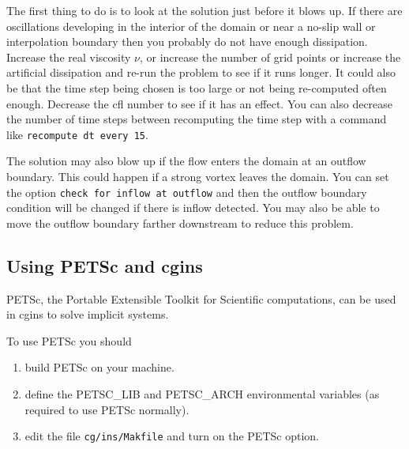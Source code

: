 \documentclass{article}
\begin{document}
The first thing to do is to look at the solution just before it blows up. If
there are oscillations developing in the interior of the domain or near a
no-slip wall or interpolation boundary then you probably do not have enough
dissipation. Increase the real viscosity $\nu$, or increase the number of grid
points or increase the artificial dissipation and re-run the problem to see if
it runs longer. It could also be that the time step being chosen is too large or
not being re-computed often enough. Decrease the cfl number to see if it has an
effect.  You can also decrease the number of time steps between recomputing the
time step with a command like {\tt recompute dt every 15}. 

The solution may also blow up if the flow enters the domain at an outflow boundary.
This could happen if a strong vortex leaves the domain. You can set the option
{\tt check for inflow at outflow} and then the outflow boundary condition
will be changed if there is inflow detected. You may also be able to 
move the outflow boundary farther downstream to reduce this problem. 


\clearpage



\subsection{Using PETSc and cgins}

  PETSc, the Portable Extensible Toolkit for Scientific computations\cite{petsc-manual},
can be used in cgins to solve implicit systems. 

To use PETSc you should 
\begin{enumerate}
 \item build  PETSc on your machine.
\item define the PETSC\_LIB and PETSC\_ARCH environmental variables (as required to use PETSc normally).
\item edit the file {\tt cg/ins/Makfile} and turn on the PETSc option. 
\end{enumerate}


\vfill\eject



\printindex
\end{document}
